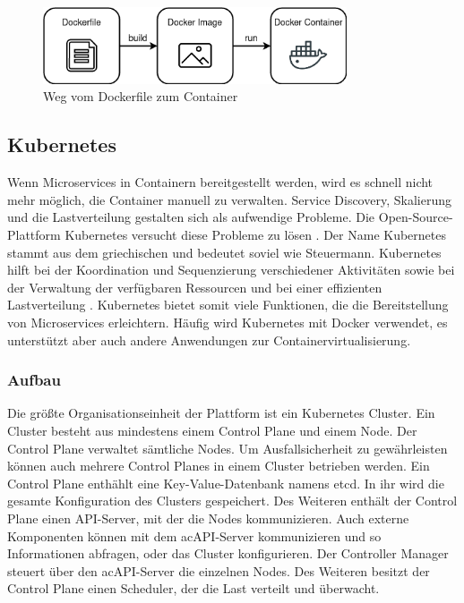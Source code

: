 \begin{figure}[H] 
    \centering
    \includegraphics[width=0.8\textwidth]{figures/DockerFileImageContainer.png}
    \caption{Weg vom Dockerfile zum Container}
\end{figure}

\subsection{Kubernetes}

Wenn Microservices in Containern bereitgestellt werden, wird es schnell nicht mehr möglich, die Container manuell zu verwalten. Service Discovery, Skalierung und die Lastverteilung gestalten sich als aufwendige Probleme. Die Open-Source-Plattform Kubernetes versucht diese Probleme zu lösen \parencite[vgl.][]{linuxfoundationKubernetes2022}. Der Name \glqq Kubernetes\grqq{} stammt aus dem griechischen und bedeutet soviel wie Steuermann. Kubernetes hilft bei der Koordination und Sequenzierung verschiedener Aktivitäten sowie bei der Verwaltung der verfügbaren Ressourcen und bei einer effizienten Lastverteilung \parencite[vgl.][S. 11]{arundelCloud2019}. Kubernetes bietet somit viele Funktionen, die die Bereitstellung von Microservices erleichtern. Häufig wird Kubernetes mit Docker verwendet, es unterstützt aber auch andere Anwendungen zur Containervirtualisierung.

\subsubsection{Aufbau}

Die größte Organisationseinheit der Plattform ist ein Kubernetes Cluster. Ein Cluster besteht aus mindestens einem Control Plane und einem Node. Der Control Plane verwaltet sämtliche Nodes. Um Ausfallsicherheit zu gewährleisten können auch mehrere Control Planes in einem Cluster betrieben werden. Ein Control Plane enthählt eine Key-Value-Datenbank namens etcd. In ihr wird die gesamte Konfiguration des Clusters gespeichert. Des Weiteren enthält der Control Plane einen \ac{API}-Server, mit der die Nodes kommunizieren. Auch externe Komponenten können mit dem ac{API}-Server kommunizieren und so Informationen abfragen, oder das Cluster konfigurieren. Der Controller Manager steuert über den ac{API}-Server die einzelnen Nodes. Des Weiteren besitzt der Control Plane einen Scheduler, der die Last verteilt und überwacht.

